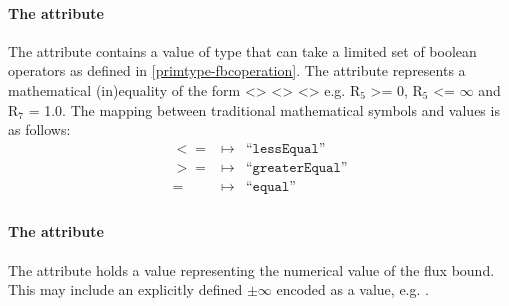 \paragraph{The  attribute}
The  attribute contains a value of type
 that can take a limited set of boolean operators as
defined in \ref{primtype-fbcoperation}. The  attribute
represents a mathematical (in)equality of the form <>
<> <> e.g. R$_{5}$
>= 0, R$_{5}$ <= $\infty$ and R$_{7}$ = 1.0. The mapping between traditional
mathematical symbols and  values is as follows:
%
\begin{eqnarray*}
\label{fb-operation-enum}
 \nonumber
  <= & \mapsto & \textrm{``}\mathtt{lessEqual}\textrm{''}\\
  >= & \mapsto & \textrm{``}\mathtt{greaterEqual}\textrm{''}\\
  = & \mapsto & \textrm{``}\mathtt{equal}\textrm{''}\\
\end{eqnarray*}
%
\paragraph{The  attribute}
The  attribute holds a  value representing the
numerical value of the flux bound. This may include an explicitly defined
$\pm\infty$ encoded as a value, e.g. .

